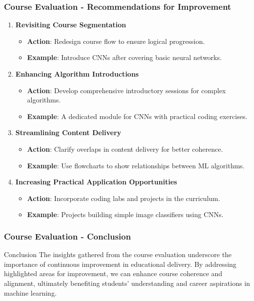 \documentclass[aspectratio=169]{beamer}
\begin{document}
\begin{frame}[fragile]
    \frametitle{Course Evaluation - Recommendations for Improvement}
    \begin{enumerate}
        \item \textbf{Revisiting Course Segmentation}
            \begin{itemize}
                \item \textbf{Action}: Redesign course flow to ensure logical progression.
                \item \textbf{Example}: Introduce CNNs after covering basic neural networks.
            \end{itemize}

        \item \textbf{Enhancing Algorithm Introductions}
            \begin{itemize}
                \item \textbf{Action}: Develop comprehensive introductory sessions for complex algorithms.
                \item \textbf{Example}: A dedicated module for CNNs with practical coding exercises.
            \end{itemize}

        \item \textbf{Streamlining Content Delivery}
            \begin{itemize}
                \item \textbf{Action}: Clarify overlaps in content delivery for better coherence.
                \item \textbf{Example}: Use flowcharts to show relationships between ML algorithms.
            \end{itemize}

        \item \textbf{Increasing Practical Application Opportunities}
            \begin{itemize}
                \item \textbf{Action}: Incorporate coding labs and projects in the curriculum.
                \item \textbf{Example}: Projects building simple image classifiers using CNNs.
            \end{itemize}
    \end{enumerate}
\end{frame}

\begin{frame}[fragile]
    \frametitle{Course Evaluation - Conclusion}
    \begin{block}{Conclusion}
        The insights gathered from the course evaluation underscore the importance of continuous improvement in educational delivery. 
        By addressing highlighted areas for improvement, we can enhance course coherence and alignment, ultimately benefiting students' understanding and career aspirations in machine learning.
    \end{block}
\end{frame}
\end{document}
